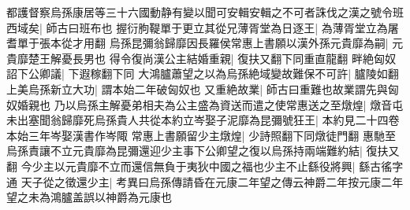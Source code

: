 都護督察烏孫康居等三十六國動静有變以聞可安輯安輯之不可者誅伐之漢之號令班西域矣|{
	師古曰班布也}
握衍朐鞮單于更立其從兄薄胥堂為日逐王|{
	為薄胥堂立為屠耆單于張本從才用翻}
烏孫昆彌翁歸靡因長羅侯常惠上書願以漢外孫元貴靡為嗣|{
	元貴靡楚王解憂長男也}
得令復尚漢公主結婚重親|{
	復扶又翻下同重直龍翻}
畔絶匈奴詔下公卿議|{
	下遐稼翻下同}
大鴻臚蕭望之以為烏孫絶域變故難保不可許|{
	臚陵如翻}
上美烏孫新立大功|{
	謂本始二年破匈奴也}
又重絶故業|{
	師古曰重難也故業謂先與匈奴婚親也}
乃以烏孫主解憂弟相夫為公主盛為資送而遣之使常惠送之至燉煌|{
	燉音屯}
未出塞聞翁歸靡死烏孫貴人共從本約立岑娶子泥靡為昆彌號狂王|{
	本約見二十四卷本始三年岑娶漢書作岑陬}
常惠上書願留少主燉煌|{
	少詩照翻下同燉徒門翻}
惠馳至烏孫責讓不立元貴靡為昆彌還迎少主事下公卿望之復以烏孫持兩端難約結|{
	復扶又翻}
今少主以元貴靡不立而還信無負于夷狄中國之福也少主不止繇役將興|{
	繇古徭字通}
天子從之徵還少主|{
	考異曰烏孫傳請昏在元康二年望之傳云神爵二年按元康二年望之未為鴻臚盖誤以神爵為元康也}


